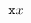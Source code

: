 \documentclass{article}
\begin{document}
\begin{math}
\tracingcommands=1\tracingmacros=1\mathtt{x}\tracingcommands=0\tracingmacros=0 x
\end{math}
\end{document}
